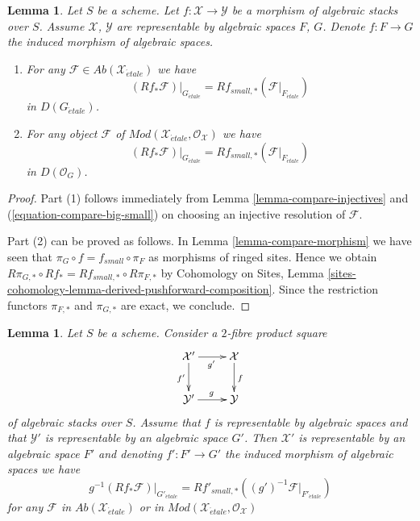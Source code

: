 \documentclass{stacks-project}
\theoremstyle{plain}
\newtheorem{lemma}[subsection]{Lemma}
\theoremstyle{definition}
\theoremstyle{remark}
\numberwithin{equation}{subsection}
\def\etale{{\acute{e}tale}}
\begin{document}
\begin{lemma}
\label{lemma-compare-morphism-cohomology}
Let $S$ be a scheme. Let $f : \mathcal{X} \to \mathcal{Y}$ be a morphism
of algebraic stacks over $S$. Assume $\mathcal{X}$, $\mathcal{Y}$ are
representable by algebraic spaces $F$, $G$. Denote $f : F \to G$ the
induced morphism of algebraic spaces.
\begin{enumerate}
\item For any $\mathcal{F} \in \textit{Ab}(\mathcal{X}_\etale)$
we have
$$
(Rf_*\mathcal{F})|_{G_\etale} =
Rf_{small, *}(\mathcal{F}|_{F_\etale})
$$
in $D(G_\etale)$.
\item For any object $\mathcal{F}$ of
$\textit{Mod}(\mathcal{X}_\etale, \mathcal{O}_\mathcal{X})$
we have
$$
(Rf_*\mathcal{F})|_{G_\etale} =
Rf_{small, *}(\mathcal{F}|_{F_\etale})
$$
in $D(\mathcal{O}_G)$.
\end{enumerate}
\end{lemma}

\begin{proof}
Part (1) follows immediately from
Lemma \ref{lemma-compare-injectives}
and (\ref{equation-compare-big-small})
on choosing an injective resolution of $\mathcal{F}$.

\medskip\noindent
Part (2) can be proved as follows. In Lemma \ref{lemma-compare-morphism}
we have seen that $\pi_G \circ f = f_{small} \circ \pi_F$ as morphisms
of ringed sites. Hence we obtain
$R\pi_{G, *} \circ Rf_* = Rf_{small, *} \circ R\pi_{F, *}$
by Cohomology on Sites, Lemma
\ref{sites-cohomology-lemma-derived-pushforward-composition}.
Since the restriction functors $\pi_{F, *}$ and $\pi_{G, *}$
are exact, we conclude.
\end{proof}

\begin{lemma}
\label{lemma-compare-representable-morphism-cohomology}
Let $S$ be a scheme. Consider a $2$-fibre product square
$$
\xymatrix{
\mathcal{X}' \ar[r]_{g'} \ar[d]_{f'} & \mathcal{X} \ar[d]^f \\
\mathcal{Y}' \ar[r]^g & \mathcal{Y}
}
$$
of algebraic stacks over $S$. Assume that $f$ is representable by algebraic
spaces and that $\mathcal{Y}'$ is representable by an algebraic space $G'$.
Then $\mathcal{X}'$ is representable by an algebraic space $F'$ and
denoting $f' : F' \to G'$ the induced morphism of algebraic spaces
we have
$$
g^{-1}(Rf_*\mathcal{F})|_{G'_\etale} =
Rf'_{small, *}((g')^{-1}\mathcal{F}|_{F'_\etale})
$$
for any $\mathcal{F}$ in $\textit{Ab}(\mathcal{X}_\etale)$
or in
$\textit{Mod}(\mathcal{X}_\etale, \mathcal{O}_\mathcal{X})$
\end{lemma}
\end{document}
